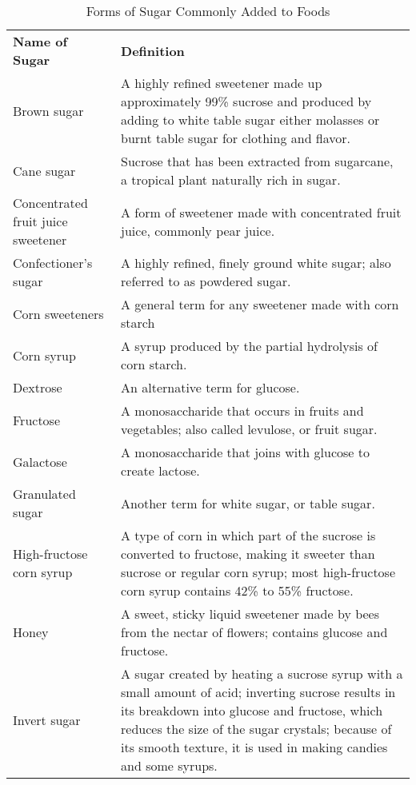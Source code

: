 \documentclass[title={Chapter 4}]{fdsn201notes}
\begin{document}
\begin{table}[H]
    \centering
    \begin{threeparttable}
		\caption{Forms of Sugar Commonly Added to Foods}
		\label{tab:forms-of-sugar commonly-added-to-foods}
		\begin{tabular}{p{} p{}}
			\rowcolor{rowdarkgreen}\textbf{Name of Sugar} & \textbf{Definition}\\
			Brown sugar & A highly refined sweetener made up approximately 99\% sucrose and produced by adding to white table sugar either molasses or burnt table sugar for clothing and flavor.\\
			Cane sugar & Sucrose that has been extracted from sugarcane, a tropical plant naturally rich in sugar.\\
			Concentrated fruit juice sweetener & A form of sweetener made with concentrated fruit juice, commonly pear juice.\\
			Confectioner's sugar & A highly refined, finely ground white sugar; also referred to as powdered sugar. \\
			Corn sweeteners & A general term for any sweetener made with corn starch\\
			Corn syrup & A syrup produced by the partial hydrolysis of corn starch.\\
			Dextrose & An alternative term for glucose.\\
			Fructose & A monosaccharide that occurs in fruits and vegetables; also called levulose, or fruit sugar.\\
			Galactose & A monosaccharide that joins with glucose to create lactose.\\
			Granulated sugar & Another term for white sugar, or table sugar.\\
			High-fructose corn syrup & A type of corn in which part of the sucrose is converted to fructose, making it sweeter than sucrose or regular corn syrup; most high-fructose corn syrup contains 42\% to 55\% fructose. \\
			Honey & A sweet, sticky liquid sweetener made by bees from the nectar of flowers; contains glucose and fructose.\\
			Invert sugar & A sugar created by heating a sucrose syrup with a small amount of acid; inverting sucrose results in its breakdown into glucose and fructose, which reduces the size of the sugar crystals; because of its smooth texture, it is used in making candies and some syrups.\\

\end{tabular}
\end{threeparttable}
\end{table}
\end{document}
